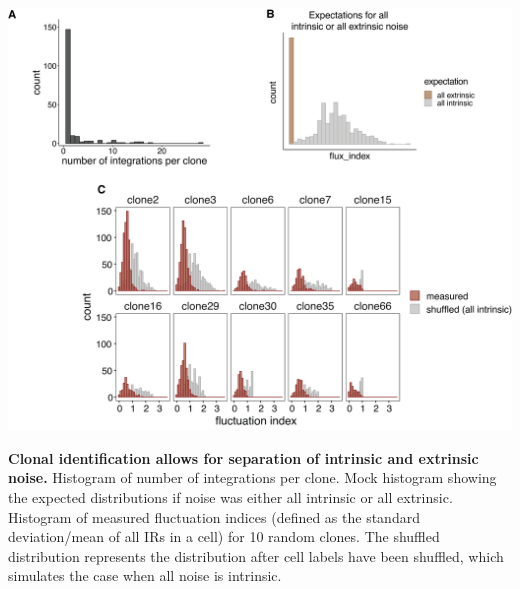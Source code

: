 \begin{suppfigure}[p]  
    \centering
    \includegraphics[width=\linewidth]{figures/cas/cas_suppfigure4.png}
    \caption[Clonal identification allows for separation of intrinsic and extrinsic noise.]{
        \textbf{Clonal identification allows for separation of intrinsic and extrinsic noise.}
        Histogram of number of integrations per clone.
        Mock histogram showing the expected distributions if noise was either all intrinsic or all extrinsic.
        Histogram of measured fluctuation indices (defined as the standard deviation/mean of all IRs in a cell) for 10 random clones. The shuffled distribution represents the distribution after cell labels have been shuffled, which simulates the case when all noise is intrinsic.   
    }
    \label{fig:cas_figureS4}
\end{suppfigure}

